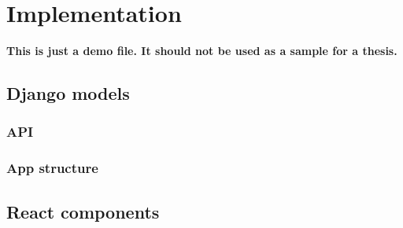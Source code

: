 \chapter{Implementation}
\label{chapter:implementation}

\textbf{This is just a demo file. It should not be used as a sample for a thesis.}\\

\section{Django models}
\label{sec:django-models}

\subsection{API}
\label{sub-sec:api}



\subsection{App structure}
\label{sub-sec:app-structure}

\section{React components}
\label{sec:react0components}

